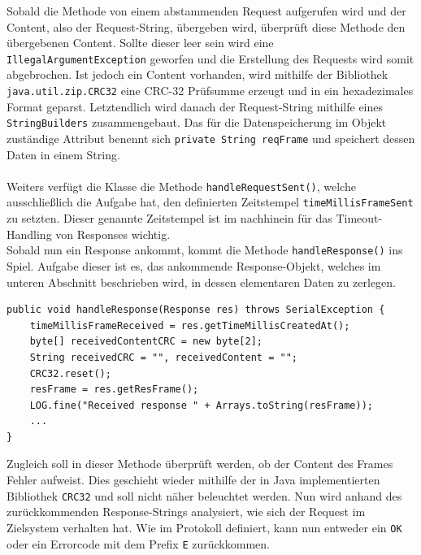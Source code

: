 Sobald die Methode von einem abstammenden Request aufgerufen wird und der Content, also der Request-String, übergeben wird, überprüft diese Methode den übergebenen Content.
Sollte dieser leer sein wird eine \lstinline[style=java]{IllegalArgumentException} geworfen und die Erstellung des Requests wird somit abgebrochen.
Ist jedoch ein Content vorhanden, wird mithilfe der Bibliothek \lstinline{java.util.zip.CRC32} eine CRC-32 Prüfsumme erzeugt und in ein hexadezimales Format geparst.
Letztendlich wird danach der Request-String mithilfe eines \lstinline{StringBuilders} zusammengebaut.
Das für die Datenspeicherung im Objekt zuständige Attribut benennt sich \lstinline[style=java]{private String reqFrame} und speichert dessen Daten in einem String.\\\\
Weiters verfügt die Klasse die Methode \lstinline[style=java]{handleRequestSent()}, welche ausschließlich die Aufgabe hat, den definierten Zeitstempel \lstinline[style=java]{timeMillisFrameSent} zu setzten.
Dieser genannte Zeitstempel ist im nachhinein für das Timeout-Handling von Responses wichtig.\\
Sobald nun ein Response ankommt, kommt die Methode \lstinline[style=java]{handleResponse()} ins Spiel.
Aufgabe dieser ist es, das ankommende Response-Objekt, welches im unteren Abschnitt beschrieben wird, in dessen elementaren Daten zu zerlegen.
%
\begin{lstlisting}[style=java,caption=Teilabschnitt Methode handleResponse(),label=handleResponse() Teilabschnitt]
public void handleResponse(Response res) throws SerialException {
    timeMillisFrameReceived = res.getTimeMillisCreatedAt();
    byte[] receivedContentCRC = new byte[2];
    String receivedCRC = "", receivedContent = "";
    CRC32.reset();
    resFrame = res.getResFrame();
    LOG.fine("Received response " + Arrays.toString(resFrame));
    ...
}
\end{lstlisting}
Zugleich soll in dieser Methode überprüft werden, ob der Content des Frames Fehler aufweist.
Dies geschieht wieder mithilfe der in Java implementierten Bibliothek \lstinline{CRC32} und soll nicht näher beleuchtet werden.
Nun wird anhand des zurückkommenden Response-Strings analysiert, wie sich der Request im Zielsystem verhalten hat.
Wie im Protokoll definiert, kann nun entweder ein \lstinline[style=java]{OK} oder ein Errorcode mit dem Prefix \lstinline[style=java]{E} zurückkommen.
